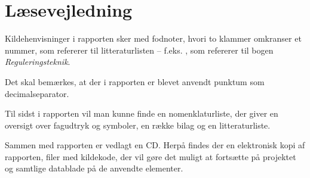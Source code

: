 \documentclass[rapport.tex]{subfiles}
\begin{document}
\section{Læsevejledning}

Kildehenvisninger i rapporten sker med fodnoter, hvori to klammer omkranser et nummer, som refererer til litteraturlisten -- f.eks. \cite{REGULERINGSTEKNIK}, som refererer til bogen \emph{Reguleringsteknik}.

Det skal bemærkes, at der i rapporten er blevet anvendt punktum som decimalseparator.

Til sidst i rapporten vil man kunne finde en nomenklaturliste, der giver en oversigt over fagudtryk og symboler, en række bilag og en litteraturliste.

Sammen med rapporten er vedlagt en CD. Herpå findes der en elektronisk kopi af rapporten, filer med kildekode, der vil gøre det muligt at fortsætte på projektet og samtlige datablade på de anvendte elementer.
\end{document}
